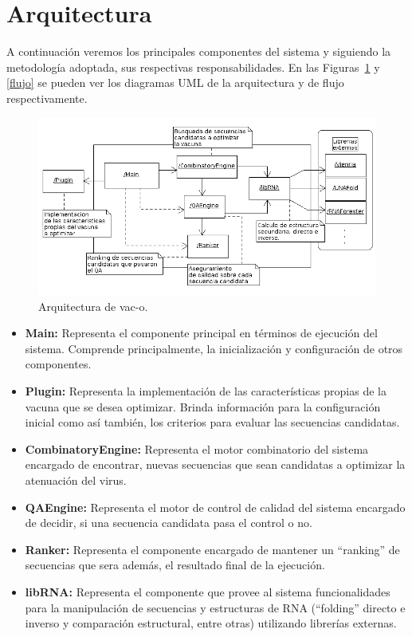 \section{Arquitectura}

A continuaci\'on veremos los principales componentes del sistema y siguiendo la
metodolog\'ia adoptada, sus respectivas responsabilidades. En las 
Figuras~\ref{arquitectura} y \ref{flujo} se pueden ver los diagramas UML
de la arquitectura y de flujo respectivamente.

\begin{figure} 
  \centering
  \includegraphics[scale=0.5]{architecture.png}
  \caption{Arquitectura de vac-o.}
\label{arquitectura}
\end{figure}

\begin{itemize}
   \item \textbf{Main:} Representa el componente principal en t\'erminos de
ejecuci\'on del sistema. Comprende principalmente, la inicializaci\'on y
configuraci\'on de otros componentes.
   \item \textbf{Plugin:} Representa la implementaci\'on de las
caracter\'isticas propias de la vacuna que se desea optimizar. Brinda
informaci\'on para la configuraci\'on inicial como as\'i tambi\'en, los
criterios para evaluar las secuencias candidatas.
   \item \textbf{CombinatoryEngine:} Representa el motor combinatorio del
sistema encargado de encontrar, nuevas secuencias que sean candidatas a
optimizar la atenuaci\'on del virus.
   \item \textbf{QAEngine:} Representa el motor de control de calidad del
sistema encargado de decidir, si una secuencia candidata pasa el control o no.
   \item \textbf{Ranker:} Representa el componente encargado de mantener un
``ranking'' de secuencias que sera adem\'as, el resultado final de la
ejecuci\'on.
   \item \textbf{libRNA:} Representa el componente que provee al sistema
funcionalidades para la manipulaci\'on de secuencias y estructuras de \ac{RNA}
(``folding'' directo e inverso y comparaci\'on estructural, entre otras)
utilizando librer\'ias externas.
  \end{itemize}

